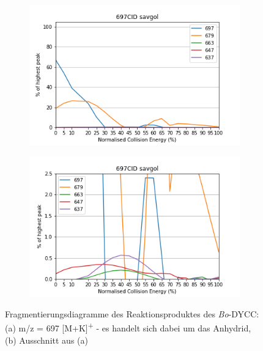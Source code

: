 \begin{figure}[!htbp]
  \begin{subfigure}[b]{0.5\textwidth}
    \includegraphics[width=\textwidth]{content/Anhang/MSLeafspray/RP_Bo-DYCC/697CID-697savgol.png}
    \caption{}
  \end{subfigure}
  \hfill
  \begin{subfigure}[b]{0.5\textwidth}
    \includegraphics[width=\textwidth]{content/Anhang/MSLeafspray/RP_Bo-DYCC/697CID-697savgolv25.png}
    \caption{}
  \end{subfigure}
  
  \caption[Fragmentierungsdiagramme des Reaktionsproduktes des \textit{Bo}-DYCC, Quelle: Autor]{Fragmentierungsdiagramme des Reaktionsproduktes des \textit{Bo}-DYCC: (a) m/z = 697 [M+K]\textsuperscript{+} - es handelt sich dabei um das Anhydrid, (b) Ausschnitt aus (a)}
\end{figure}

